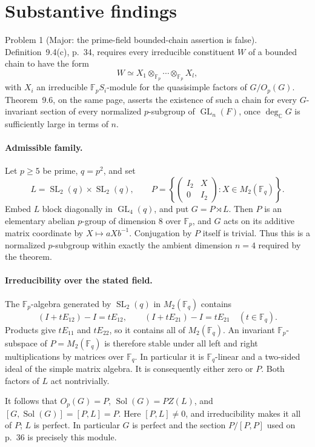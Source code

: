 \documentclass[10pt]{article}
\begin{document}
\section*{Substantive findings}
Problem 1 (Major: the prime-field bounded-chain assertion is false).  Definition 9.4(c), p. 34, requires every irreducible constituent \(W\) of a bounded chain to have the form \[W\simeq X_1\otimes_{\mathbb F_p}\cdots\otimes_{\mathbb F_p}X_l,\] with \(X_i\) an irreducible \(\mathbb F_pS_i\)-module for the quasisimple factors of \(G/O_p(G)\). Theorem 9.6, on the same page, asserts the existence of such a chain for every \(G\)-invariant section of every normalized \(p\)-subgroup of \(\operatorname{GL}_n(F)\), once \(\deg_{\mathbb C}G\) is sufficiently large in terms of \(n\).\par
\paragraph*{Admissible family.}\mbox{}\par
Let \(p\ge5\) be prime, \(q=p^2\), and set \[L=\operatorname{SL}_2(q)\times\operatorname{SL}_2(q),\qquad
 P=\left\{\begin{pmatrix}I_2&X\\0&I_2\end{pmatrix}:X\in M_2(\mathbb F_q)\right\}.\] Embed \(L\) block diagonally in \(\operatorname{GL}_4(q)\), and put \(G=P\rtimes L\). Then \(P\) is an elementary abelian \(p\)-group of dimension \(8\) over \(\mathbb F_p\), and \(G\) acts on its additive matrix coordinate by \(X\mapsto aXb^{-1}\). Conjugation by \(P\) itself is trivial. Thus this is a normalized \(p\)-subgroup within exactly the ambient dimension \(n=4\) required by the theorem.\par
\paragraph*{Irreducibility over the stated field.}\mbox{}\par
The \(\mathbb F_p\)-algebra generated by \(\operatorname{SL}_2(q)\) in \(M_2(\mathbb F_q)\) contains \[(I+tE_{12})-I=tE_{12},\qquad
 (I+tE_{21})-I=tE_{21}\quad(t\in\mathbb F_q).\] Products give \(tE_{11}\) and \(tE_{22}\), so it contains all of \(M_2(\mathbb F_q)\). An invariant \(\mathbb F_p\)-subspace of \(P=M_2(\mathbb F_q)\) is therefore stable under all left and right multiplications by matrices over \(\mathbb F_q\). In particular it is \(\mathbb F_q\)-linear and a two-sided ideal of the simple matrix algebra. It is consequently either zero or \(P\). Both factors of \(L\) act nontrivially.\par
It follows that \(O_p(G)=P\), \(\operatorname{Sol}(G)=PZ(L)\), and \([G,\operatorname{Sol}(G)]=[P,L]=P\). Here \([P,L]\ne0\), and irreducibility makes it all of \(P\); \(L\) is perfect. In particular \(G\) is perfect and the section \(P/[P,P]\) used on p. 36 is precisely this module.\par
\end{document}

